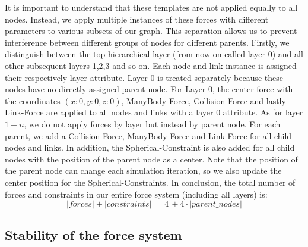 It is important to understand that these templates are not applied equally to all nodes. Instead, we apply multiple instances of these forces with different parameters to various subsets of our graph. 
This separation allows us to prevent interference between different groups of nodes for different parents.
Firstly, we distinguish between the top hierarchical layer (from now on called layer $0$) and all other subsequent layers 1,2,3 and so on. Each node and link instance is assigned their respectively layer attribute. Layer $0$ is treated separately because these nodes have no directly assigned parent node. 
For Layer $0$, the center-force with the coordinates $(x:0,y:0,z:0)$, ManyBody-Force, Collision-Force and lastly Link-Force are applied to all nodes and links with a layer $0$ attribute. 
As for layer $1 - n$, we do not apply forces by layer but instead by parent node. For each parent, we add a Collision-Force, ManyBody-Force and Link-Force for all child nodes and links. In addition, the Spherical-Constraint is also added for all child nodes with the position of the parent node as a center. Note that the position of the parent node can change each simulation iteration, so we also update the center position for the Spherical-Constraints.
In conclusion, the total number of forces and constraints in our entire force system (including all layers) is: 
\begin{equation}
    |forces| + |constraints| \: = 4 \, + 4 \cdot |parent\_nodes|
\end{equation}

\subsection{Stability of the force system}

